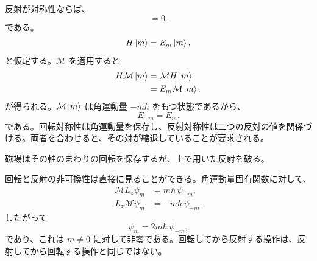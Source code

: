 反射が対称性ならば、
\begin{equation}
[\mathcal M,H]=0.
\end{equation}
である。
\begin{equation}
H\left\lvert m\right\rangle=E_m\left\lvert m\right\rangle.
\end{equation}
と仮定する。\(\mathcal M\) を適用すると
\begin{align}
H\mathcal M\left\lvert m\right\rangle
&=\mathcal M H\left\lvert m\right\rangle\\
&=E_m\mathcal M\left\lvert m\right\rangle.
\end{align}
が得られる。\(\mathcal M\left\lvert m\right\rangle\) は角運動量 \(-m\hbar\) をもつ状態であるから、
\begin{equation}
E_{-m}=E_m.
\end{equation}
である。回転対称性は角運動量を保存し、反射対称性は二つの反対の値を関係づける。両者を合わせると、その対が縮退していることが要求される。

\begin{classroomqa}
\end{classroomqa}

磁場はその軸のまわりの回転を保存するが、上で用いた反射を破る。

\begin{classroomqa}
\end{classroomqa}

回転と反射の非可換性は直接に見ることができる。角運動量固有関数に対して、
\begin{align}
\mathcal M L_z\psi_m
&=m\hbar\,\psi_{-m},\\
L_z\mathcal M\psi_m
&=-m\hbar\,\psi_{-m}.
\end{align}
したがって
\begin{equation}
[\mathcal M,L_z]\psi_m
=2m\hbar\,\psi_{-m},
\end{equation}
であり、これは \(m\neq0\) に対して非零である。回転してから反射する操作は、反射してから回転する操作と同じではない。


